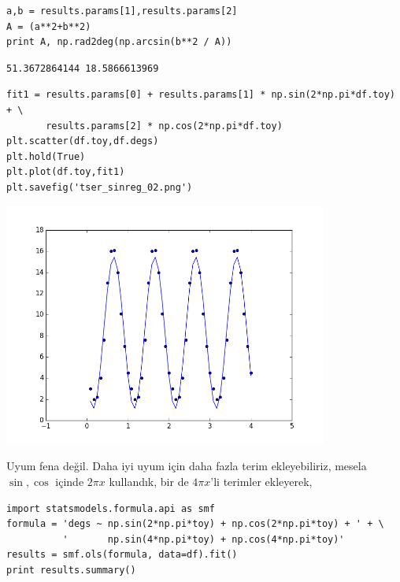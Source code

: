 \documentclass[12pt,fleqn]{article}\usepackage{../../common}
\begin{document}
\begin{verbatim}
a,b = results.params[1],results.params[2]
A = (a**2+b**2)
print A, np.rad2deg(np.arcsin(b**2 / A))
\end{verbatim}

\begin{verbatim}
51.3672864144 18.5866613969
\end{verbatim}

\begin{verbatim}
fit1 = results.params[0] + results.params[1] * np.sin(2*np.pi*df.toy) + \
       results.params[2] * np.cos(2*np.pi*df.toy)
plt.scatter(df.toy,df.degs)
plt.hold(True)
plt.plot(df.toy,fit1)
plt.savefig('tser_sinreg_02.png')
\end{verbatim}

\includegraphics[height=8cm]{tser_sinreg_02.png}

Uyum fena değil. Daha iyi uyum için daha fazla terim ekleyebiliriz, mesela 
$\sin,\cos$ içinde $2 \pi x$ kullandık, bir de $4 \pi x$'li terimler ekleyerek,

\begin{verbatim}
import statsmodels.formula.api as smf
formula = 'degs ~ np.sin(2*np.pi*toy) + np.cos(2*np.pi*toy) + ' + \
          '       np.sin(4*np.pi*toy) + np.cos(4*np.pi*toy)'
results = smf.ols(formula, data=df).fit()
print results.summary()
\end{verbatim}
\end{document}
